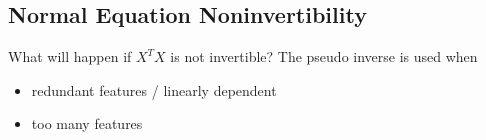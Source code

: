 \documentclass[en,11pt,english,black,simple]{../elegantbook}
\begin{document}
\subsection{Normal Equation Noninvertibility}

What will happen if \(X^T X\) is not invertible? The pseudo inverse is used when \begin{itemize}
    \item redundant features / linearly dependent 
    \item too many features 
\end{itemize}



\let\chapname\undefined
\ifx\mainclass\undefined
\end{document}
